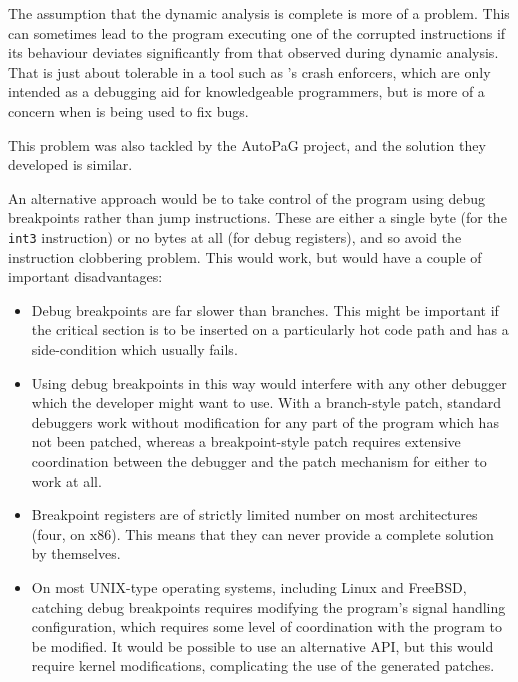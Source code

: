 The assumption that the dynamic analysis is complete is more of a
problem.  This can sometimes lead to the program executing one of the
corrupted instructions if its behaviour deviates significantly from
that observed during dynamic analysis.  That is just about tolerable
in a tool such as {\technique}'s crash enforcers, which are only
intended as a debugging aid for knowledgeable programmers, but is more
of a concern when {\technique} is being used to fix bugs. 

This problem was also tackled by the AutoPaG project, and the solution
they developed is similar. 

An alternative approach would be to take control of the program using
debug breakpoints rather than jump instructions.  These are either a
single byte (for the \verb|int3| instruction) or no bytes at all (for
debug registers), and so avoid the instruction clobbering problem.
This would work, but would have a couple of important disadvantages:

\begin{itemize}
\item
  Debug breakpoints are far slower than branches.  This might be
  important if the critical section is to be inserted on
  a particularly hot code path and has a side-condition which usually
  fails.
\item
  Using debug breakpoints in this way would interfere with any other
  debugger which the developer might want to use.  With a branch-style
  patch, standard debuggers work without modification for any part of
  the program which has not been patched, whereas a breakpoint-style
  patch requires extensive coordination between the debugger and the
  patch mechanism for either to work at all.
\item
  Breakpoint registers are of strictly limited number on most
  architectures (four, on x86).  This means that they can never
  provide a complete solution by themselves.
\item
  On most UNIX-type operating systems, including Linux and FreeBSD,
  catching debug breakpoints requires modifying the program's signal
  handling configuration, which requires some level of coordination
  with the program to be modified.  It would be possible to use an
  alternative API, but this would require kernel modifications,
  complicating the use of the generated patches.
\end{itemize}

